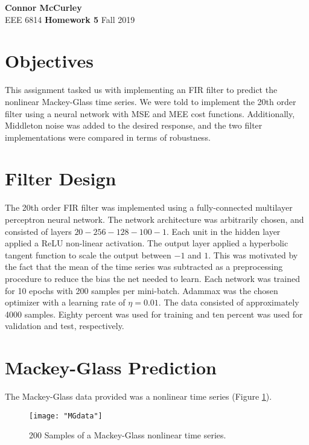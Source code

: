\documentclass{article}[12 pt]
\begin{document}
	
\begin{center}
	\textbf{\Large Connor McCurley} \\
	EEE 6814 \qquad \textbf{\large Homework 5} \qquad Fall 2019 
\end{center}

\section{Objectives}
This assignment tasked us with implementing an FIR filter to predict the nonlinear Mackey-Glass time series.  We were told to implement the 20th order filter using a neural network with MSE and MEE cost functions.  Additionally, Middleton noise was added to the desired response, and the two filter implementations were compared in terms of robustness.

\section{Filter Design}  
The 20th order FIR filter was implemented using a fully-connected multilayer perceptron neural network.  The network architecture was arbitrarily chosen, and consisted of layers $20-256-128-100-1$.  Each unit in the hidden layer applied a ReLU non-linear activation.  The output layer applied a hyperbolic tangent function to scale the output between $-1$ and $1$.  This was motivated by the fact that the mean of the time series was subtracted as a preprocessing procedure to reduce the bias the net needed to learn.  Each network was trained for 10 epochs with 200 samples per mini-batch.  Adammax was the chosen optimizer with a learning rate of $\eta=0.01$.  The data consisted of approximately 4000 samples.  Eighty percent was used for training and ten percent was used for validation and test, respectively. 

\section{Mackey-Glass Prediction}
The Mackey-Glass data provided was a nonlinear time series (Figure \ref{fig:MGdata}).

\begin{center}
	\begin{figure}[H]
		\centering
		\texttt{[image: "MGdata"]}
		\caption{200 Samples of a Mackey-Glass nonlinear time series.}
		\label{fig:MGdata}
	\end{figure}
\end{center}
\end{document}

